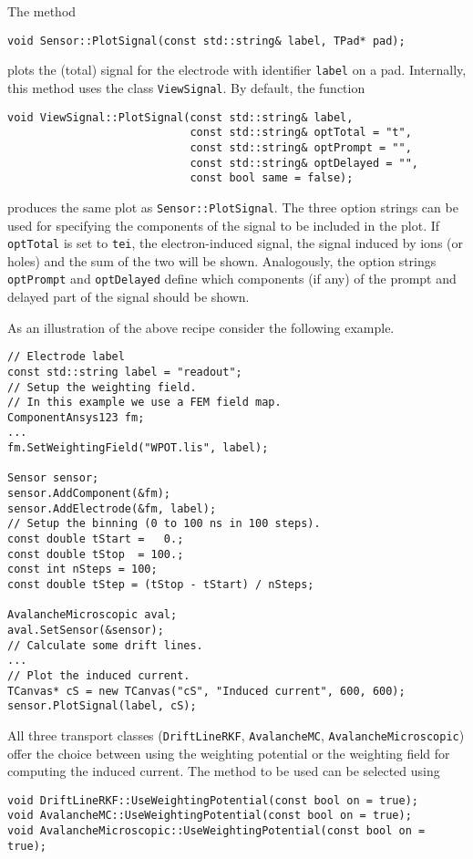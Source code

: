 The method 
\begin{lstlisting}
void Sensor::PlotSignal(const std::string& label, TPad* pad);
\end{lstlisting}
plots the (total) signal for the electrode with identifier \texttt{label} 
on a pad.
Internally, this method uses the class \texttt{ViewSignal}. 
By default, the function
\begin{lstlisting}
void ViewSignal::PlotSignal(const std::string& label,
                            const std::string& optTotal = "t",
                            const std::string& optPrompt = "",
                            const std::string& optDelayed = "",
                            const bool same = false);
\end{lstlisting} 
produces the same plot as \texttt{Sensor::PlotSignal}. 
The three option strings can be used for specifying the components of the 
signal to be included in the plot. If \texttt{optTotal} is set to \texttt{tei}, the electron-induced signal, the signal induced by ions (or holes) and the sum of the two will be shown. Analogously, the option strings \texttt{optPrompt} and \texttt{optDelayed} define which components (if any) of the 
prompt and delayed part of the signal should be shown. 

As an illustration of the above recipe consider the following example. 
\begin{lstlisting}
// Electrode label
const std::string label = "readout";
// Setup the weighting field.
// In this example we use a FEM field map.
ComponentAnsys123 fm;
...
fm.SetWeightingField("WPOT.lis", label);

Sensor sensor;
sensor.AddComponent(&fm);
sensor.AddElectrode(&fm, label);
// Setup the binning (0 to 100 ns in 100 steps).
const double tStart =   0.;
const double tStop  = 100.;
const int nSteps = 100;
const double tStep = (tStop - tStart) / nSteps;

AvalancheMicroscopic aval;
aval.SetSensor(&sensor);
// Calculate some drift lines.
...
// Plot the induced current.
TCanvas* cS = new TCanvas("cS", "Induced current", 600, 600);
sensor.PlotSignal(label, cS);
\end{lstlisting}

All three transport classes (\texttt{DriftLineRKF}, \texttt{AvalancheMC}, \texttt{AvalancheMicroscopic}) offer the choice 
between using the weighting potential or the weighting field for computing 
the induced current. The method to be used can be selected using
\begin{lstlisting}
void DriftLineRKF::UseWeightingPotential(const bool on = true);
void AvalancheMC::UseWeightingPotential(const bool on = true);
void AvalancheMicroscopic::UseWeightingPotential(const bool on = true);
\end{lstlisting} 

